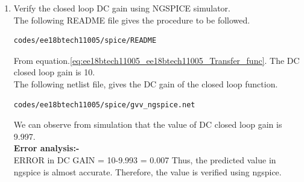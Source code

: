 \begin{enumerate}[label=\arabic*.,ref=\theenumi]
\item Verify the closed loop DC gain using NGSPICE simulator.
\\
\solution 
The following README file gives the procedure to be followed.
\begin{lstlisting}
codes/ee18btech11005/spice/README
\end{lstlisting}
From equation.\ref{eq:ee18btech11005_ee18btech11005_Transfer_func}.
The DC closed loop gain is 10.\\
The following netlist file, gives the DC gain of the closed loop function.
\begin{lstlisting}
codes/ee18btech11005/spice/gvv_ngspice.net
\end{lstlisting}
We can observe from simulation that the value of DC closed loop gain is 9.997.\\
\textbf{Error analysis:-}\\
ERROR in DC GAIN = 10-9.993 = 0.007
Thus, the predicted value in ngspice is almost accurate.
Therefore, the value is verified using ngspice.


\end{enumerate}
